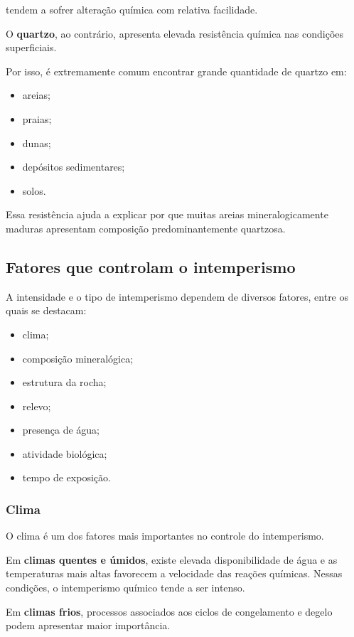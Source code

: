 \documentclass[a4paper,12pt]{article}
\theoremstyle{definition}
\theoremstyle{definition}
\theoremstyle{definition}
\begin{document}
tendem a sofrer alteração química com relativa facilidade.

O \textbf{quartzo}, ao contrário, apresenta elevada resistência química nas condições superficiais.

Por isso, é extremamente comum encontrar grande quantidade de quartzo em:

\begin{itemize}
    \item areias;
    \item praias;
    \item dunas;
    \item depósitos sedimentares;
    \item solos.
\end{itemize}

Essa resistência ajuda a explicar por que muitas areias mineralogicamente maduras apresentam composição predominantemente quartzosa.

\subsection{Fatores que controlam o intemperismo}

A intensidade e o tipo de intemperismo dependem de diversos fatores, entre os quais se destacam:

\begin{itemize}
    \item clima;
    \item composição mineralógica;
    \item estrutura da rocha;
    \item relevo;
    \item presença de água;
    \item atividade biológica;
    \item tempo de exposição.
\end{itemize}

\subsubsection{Clima}

O clima é um dos fatores mais importantes no controle do intemperismo.

Em \textbf{climas quentes e úmidos}, existe elevada disponibilidade de água e as temperaturas mais altas favorecem a velocidade das reações químicas. Nessas condições, o intemperismo químico tende a ser intenso.

Em \textbf{climas frios}, processos associados aos ciclos de congelamento e degelo podem apresentar maior importância.
\end{document}
